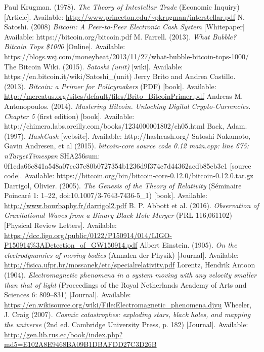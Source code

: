 \documentclass[conference]{IEEEtran}
\begin{document}

\begin{thebibliography}{9}
	Paul Krugman.
	(1978).	
	\textit{The Theory of Intestellar Trade}
	(Economic Inquiry)
	[Article].
	Available: \url{http://www.princeton.edu/~pkrugman/interstellar.pdf}
	N. Satoshi. 
	(2008)
	\textit{Bitcoin: A Peer-to-Peer Electronic Cash System}
	[Whitepaper]
	Available: https://bitcoin.org/bitcoin.pdf
	M. Farrell. 
	(2013).	
	\textit{What Bubble? Bitcoin Tops \$1000}
	[Online].
	Available: https://blogs.wsj.com/moneybeat/2013/11/27/what-bubble-bitcoin-tops-1000/
	The Bitcoin Wiki.
	(2015).	
	\textit{Satoshi (unit)}
	[wiki].
	Available: https://en.bitcoin.it/wiki/Satoshi\_(unit)
	Jerry Brito and Andrea Castillo.
	(2013).	
	\textit{Bitcoin: a Primer for Policymakers}
	(PDF)
	[book].
	Available: \url{http://mercatus.org/sites/default/files/Brito_BitcoinPrimer.pdf}		
	Andreas M. Antonopoulos.
	(2014).
	\textit{Mastering Bitcoin. Unlocking Digital Crypto-Currencies. Chapter 5}
	(first edition)
	[book].
	Available: http://chimera.labs.oreilly.com/books/1234000001802/ch05.html
	Back, Adam. 
	(1997).	
	\textit{HashCash}
	[website].
	Available: http://hashcash.org/
	Satoshi Nakamoto, Gavin Andresen, et al
	(2015).	
	\textit{bitcoin-core source code 0.12 main.cpp: line 675: nTargetTimespan}
	SHA256sum: 0f1cda66c841a548a07cc37e80b0727354b1236d9f374c7d44362acdb85eb3e1
	[source code].
	Available: https://bitcoin.org/bin/bitcoin-core-0.12.0/bitcoin-0.12.0.tar.gz
	Darrigol, Olivier.
	(2005).	
	\textit{The Genesis of the Theory of Relativity}
	(Séminaire Poincaré 1: 1–22, doi:10.1007/3-7643-7436-5\_1)
	[book].
	Available: \url{http://www.bourbaphy.fr/darrigol2.pdf}
	B. P. Abbott et al. 
	(2016).	
	\textit{Observation of Gravitational Waves from a Binary Black Hole Merger}
	(PRL 116,061102)
	[Physical Review Letters].
	Available: \url{https://dcc.ligo.org/public/0122/P150914/014/LIGO-P150914\%3ADetection_of_GW150914.pdf}
	Albert Einstein. 
	(1905).	
	\textit{On the electrodynamics of moving bodies}
	(Annalen der Physik)
	[Journal].
	Available: \url{http://fisica.ufpr.br/mossanek/etc/specialrelativity.pdf}
	Lorentz, Hendrik Antoon
	(1904).	
	\textit{Electromagnetic phenomena in a system moving with any velocity smaller than that of light}
	(Proceedings of the Royal Netherlands Academy of Arts and Sciences 6: 809–831)
	[Journal].
	Available: \url{https://en.wikisource.org/wiki/File:Electromagnetic_phenomena.djvu}
	Wheeler, J. Craig 
	(2007).	
	\textit{ Cosmic catastrophes: exploding stars, black holes, and mapping the universe}
	(2nd ed. Cambridge University Press, p. 182)
	[Journal].
	Available: \url{http://gen.lib.rus.ec/book/index.php?md5=E102A8E9468BA09B1DBAFDD27C3D26B}




\end{thebibliography}
\end{document}
